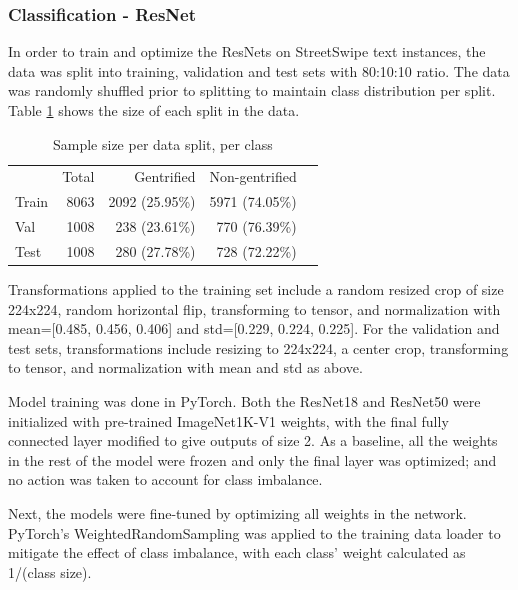 \subsubsection{Classification - ResNet}

In order to train and optimize the ResNets on StreetSwipe text instances, the data was split into training, validation and test sets with 80:10:10 ratio. The data was randomly shuffled prior to splitting to maintain class distribution per split. Table \ref{tab:data_split} shows the size of each split in the data.

\begin{table}[]
    \begin{tabular}{lrrrl}
    \toprule
            & \multicolumn{1}{r}{Total} &\multicolumn{1}{r}{Gentrified} & \multicolumn{1}{r}{Non-gentrified} \\ \cline{1-4}
Train       & 8063                      & 2092 (25.95\%)                & 5971 (74.05\%)      \\
Val         & 1008                      & 238 (23.61\%)                 & 770 (76.39\%)       \\
Test        & 1008                      & 280 (27.78\%)                 & 728 (72.22\%)       \\
    \bottomrule
    \end{tabular}
    \caption{Sample size per data split, per class}
    \label{tab:data_split}
\end{table}

Transformations applied to the training set include a random resized crop of size 224x224, random horizontal flip, transforming to tensor, and normalization with mean=[0.485, 0.456, 0.406] and std=[0.229, 0.224, 0.225]. For the validation and test sets, transformations include resizing to 224x224, a center crop, transforming to tensor, and normalization with mean and std as above.

Model training was done in PyTorch. Both the ResNet18 and ResNet50 were initialized with pre-trained ImageNet1K-V1 weights, with the final fully connected layer modified to give outputs of size 2. As a baseline, all the weights in the rest of the model were frozen and only the final layer was optimized; and no action was taken to account for class imbalance.

Next, the models were fine-tuned by optimizing all weights in the network. PyTorch's WeightedRandomSampling was applied to the training data loader to mitigate the effect of class imbalance, with each class' weight calculated as 1/(class size).

